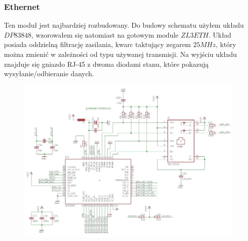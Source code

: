 \documentclass[12pt]{article}
\begin{document}
\subsubsection{Ethernet}
Ten moduł jest najbardziej rozbudowany. Do budowy schematu użyłem układu $DP83848$, wzorowałem się natomiast na gotowym module $ZL3ETH$. Układ posiada oddzielną filtrację zasilania, kwarc taktujący zegarem $25MHz$, który można zmienić w zależności od typu używanej transmisji. Na wyjściu układu znajduje się gniazdo RJ-45 z dwoma diodami stanu, które pokazują wysyłanie/odbieranie danych.
\begin{figure}[H]
\begin{center}
\includegraphics[width=1\textwidth]{figures/schemat6.jpg}
\end{center}
\end{figure}
\end{document}
